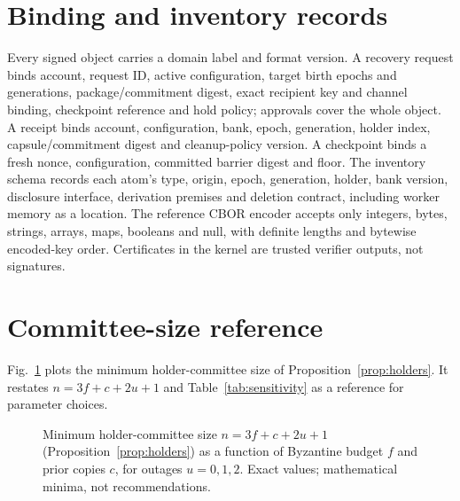 \documentclass[pdflatex,sn-mathphys-num,twocolumn]{sn-jnl}
\theoremstyle{plain}
\theoremstyle{definition}
\begin{document}
\begin{appendices}
\section{Binding and inventory records}\label{app:binding}
Every signed object carries a domain label and format version. A recovery request binds account, request ID, active configuration, target birth epochs and generations, package/commitment digest, exact recipient key and channel binding, checkpoint reference and hold policy; approvals cover the whole object. A receipt binds account, configuration, bank, epoch, generation, holder index, capsule/commitment digest and cleanup-policy version. A checkpoint binds a fresh nonce, configuration, committed barrier digest and floor. The inventory schema records each atom's type, origin, epoch, generation, holder, bank version, disclosure interface, derivation premises and deletion contract, including worker memory as a location. The reference CBOR encoder accepts only integers, bytes, strings, arrays, maps, booleans and null, with definite lengths and bytewise encoded-key order. Certificates in the kernel are trusted verifier outputs, not signatures.

\section{Committee-size reference}\label{app:params}
Fig.~\ref{fig:minholders} plots the minimum holder-committee size of Proposition~\ref{prop:holders}. It restates $n=3f+c+2u+1$ and Table~\ref{tab:sensitivity} as a reference for parameter choices.

\begin{figure}[t]
\centering

\caption{Minimum holder-committee size $n=3f+c+2u+1$ (Proposition~\ref{prop:holders}) as a function of Byzantine budget $f$ and prior copies $c$, for outages $u=0,1,2$. Exact values; mathematical minima, not recommendations.}\label{fig:minholders}
\end{figure}
\end{appendices}

\clearpage

\end{document}
